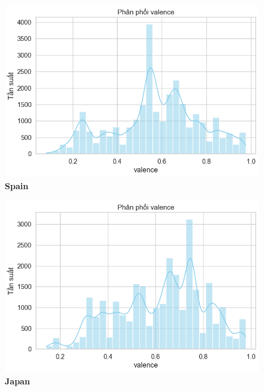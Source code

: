 \begin{itemize}
           \begin{figure}[H]
        \centering
        \begin{minipage}{0.45\textwidth}
            \centering
            \includegraphics[width=\linewidth]{../graphics/data_top50/figure/5/EDA_spain.png}
            \\[4pt] {\small \textbf{Spain}}
        \end{minipage}
        \hfill
        \begin{minipage}{0.45\textwidth}
            \centering
            \includegraphics[width=\linewidth]{../graphics/data_top50/figure/5/EDA_japan.png}
            \\[4pt] {\small \textbf{Japan}}
        \end{minipage}

        \vspace{0.4cm}


\end{figure}
\end{itemize}
